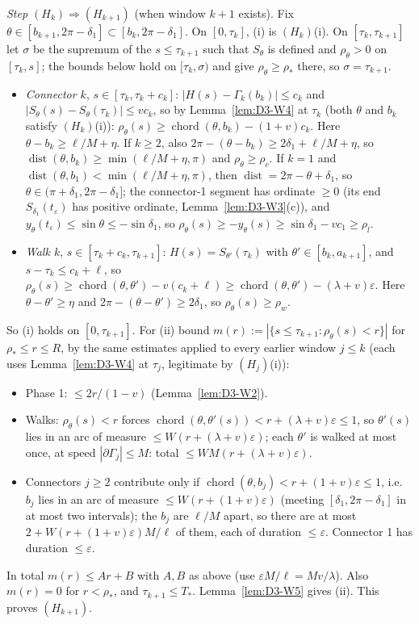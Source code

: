 \emph{Step $(H_k)\Rightarrow(H_{k+1})$} (when window $k+1$ exists). Fix $\theta\in[b_{k+1},2\pi-\delta_1]\subset[b_k,2\pi-\delta_1]$.
On $[0,\tau_k]$, (i) is $(H_k)$(i). On $[\tau_k,\tau_{k+1}]$ let $\sigma$ be the supremum of the $s\le\tau_{k+1}$ such that $S_\theta$ is
defined and $\rho_\theta>0$ on $[\tau_k,s]$; the bounds below hold on $[\tau_k,\sigma)$ and give $\rho_\theta\ge\rho_*$ there, so
$\sigma=\tau_{k+1}$.
\begin{itemize}
\item \emph{Connector $k$}, $s\in[\tau_k,\tau_k+c_k]$: $|H(s)-\Gamma_k(b_k)|\le c_k$ and $|S_\theta(s)-S_\theta(\tau_k)|\le vc_k$, so by
Lemma~\ref{lem:D3-W4} at $\tau_k$ (both $\theta$ and $b_k$ satisfy $(H_k)$(i)):
$\rho_\theta(s)\ge\operatorname{chord}(\theta,b_k)-(1+v)c_k$. Here $\theta-b_k\ge\ell/M+\eta$. If $k\ge2$, also
$2\pi-(\theta-b_k)\ge2\delta_1+\ell/M+\eta$, so $\operatorname{dist}(\theta,b_k)\ge\min(\ell/M+\eta,\pi)$ and $\rho_\theta\ge\rho_c$. If
$k=1$ and $\operatorname{dist}(\theta,b_1)<\min(\ell/M+\eta,\pi)$, then $\operatorname{dist}=2\pi-\theta+\delta_1$, so
$\theta\in(\pi+\delta_1,2\pi-\delta_1]$; the connector-1 segment has ordinate $\ge0$ (its end $S_{\delta_1}(t_\varepsilon)$ has positive
ordinate, Lemma~\ref{lem:D3-W3}(c)), and $y_\theta(t_\varepsilon)\le\sin\theta\le-\sin\delta_1$, so
$\rho_\theta(s)\ge-y_\theta(s)\ge\sin\delta_1-vc_1\ge\rho_l$.
\item \emph{Walk $k$}, $s\in[\tau_k+c_k,\tau_{k+1}]$: $H(s)=S_{\theta'}(\tau_k)$ with $\theta'\in[b_k,a_{k+1}]$, and
$s-\tau_k\le c_k+\ell$, so $\rho_\theta(s)\ge\operatorname{chord}(\theta,\theta')-v(c_k+\ell)\ge\operatorname{chord}(\theta,\theta')-(\lambda+v)\varepsilon$.
Here $\theta-\theta'\ge\eta$ and $2\pi-(\theta-\theta')\ge2\delta_1$, so $\rho_\theta(s)\ge\rho_w$.
\end{itemize}
So (i) holds on $[0,\tau_{k+1}]$. For (ii) bound $m(r):=|\{s\le\tau_{k+1}:\rho_\theta(s)<r\}|$ for $\rho_*\le r\le R$, by the same
estimates applied to every earlier window $j\le k$ (each uses Lemma~\ref{lem:D3-W4} at $\tau_j$, legitimate by $(H_j)$(i)):
\begin{itemize}
\item Phase 1: $\le2r/(1-v)$ (Lemma~\ref{lem:D3-W2}).
\item Walks: $\rho_\theta(s)<r$ forces $\operatorname{chord}(\theta,\theta'(s))<r+(\lambda+v)\varepsilon\le1$, so $\theta'(s)$ lies in an
arc of measure $\le W(r+(\lambda+v)\varepsilon)$; each $\theta'$ is walked at most once, at speed $|\partial\Gamma_j|\le M$: total
$\le WM(r+(\lambda+v)\varepsilon)$.
\item Connectors $j\ge2$ contribute only if $\operatorname{chord}(\theta,b_j)<r+(1+v)\varepsilon\le1$, i.e.\ $b_j$ lies in an arc of
measure $\le W(r+(1+v)\varepsilon)$ (meeting $[\delta_1,2\pi-\delta_1]$ in at most two intervals); the $b_j$ are $\ell/M$ apart, so
there are at most $2+W(r+(1+v)\varepsilon)M/\ell$ of them, each of duration $\le\varepsilon$. Connector 1 has duration $\le\varepsilon$.
\end{itemize}
In total $m(r)\le Ar+B$ with $A,B$ as above (use $\varepsilon M/\ell=Mv/\lambda$). Also $m(r)=0$ for $r<\rho_*$, and
$\tau_{k+1}\le T_*$. Lemma~\ref{lem:D3-W5} gives (ii). This proves $(H_{k+1})$.


